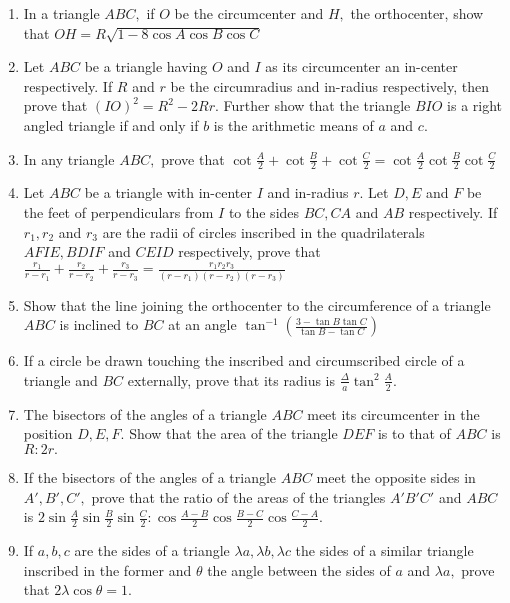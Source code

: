 \begin{enumerate}
\item In a triangle $ABC,$ if $O$ be the circumcenter and $H,$ the orthocenter, show that $OH = R\sqrt{1 -
   8\cos A\cos B\cos C}$

\item Let $ABC$ be a triangle having $O$ and $I$ as its circumcenter an in-center respectively. If $R$ and
   $r$ be the circumradius and in-radius respectively, then prove that $(IO)^2 = R^2 - 2Rr.$ Further show that the
   triangle $BIO$ is a right angled triangle if and only if $b$ is the arithmetic means of $a$ and $c.$

\item In any triangle $ABC,$ prove that $\cot\frac{A}{2} + \cot\frac{B}{2} + \cot\frac{C}{2} =
   \cot\frac{A}{2}\cot\frac{B}{2}\cot\frac{C}{2}$

\item Let $ABC$ be a triangle with in-center $I$ and in-radius $r.$ Let $D, E$ and $F$ be the feet of
   perpendiculars from $I$ to the sides $BC, CA$ and $AB$ respectively. If $r_1, r_2$ and $r_3$ are
   the radii of circles inscribed in the quadrilaterals $AFIE, BDIF$ and $CEID$ respectively, prove that
   $\frac{r_1}{r - r_1} + \frac{r_2}{r - r_2} + \frac{r_3}{r - r_3} = \frac{r_1r_2r_3}{(r - r_1)(r - r_2)(r - r_3)}$

\item Show that the line joining the orthocenter to the circumference of a triangle $ABC$ is inclined to $BC$ at an angle
   $\tan^{-1}\left(\frac{3 - \tan B\tan C}{\tan B - \tan C}\right)$

\item If a circle be drawn touching the inscribed and circumscribed circle of a triangle and $BC$ externally, prove that its
   radius is $\frac{\Delta}{a}\tan^2\frac{A}{2}.$

\item The bisectors of the angles of a triangle $ABC$ meet its circumcenter in the position $D, E, F.$ Show that the area
   of the triangle $DEF$ is to that of $ABC$ is $R:2r.$

\item If the bisectors of the angles of a triangle $ABC$ meet the opposite sides in $A', B', C',$ prove that the ratio of
   the areas of the triangles $A'B'C'$ and $ABC$ is $2\sin\frac{A}{2}\sin\frac{B}{2}\sin\frac{C}{2}:\cos\frac{A -
   B}{2}\cos\frac{B - C}{2}\cos\frac{C - A}{2}.$

\item If $a, b, c$ are the sides of a triangle $\lambda a, \lambda b, \lambda c$ the sides of a similar triangle inscribed
   in the former and $\theta$ the angle between the sides of $a$ and $\lambda a,$ prove that
   $2\lambda\cos\theta = 1.$


\end{enumerate}
